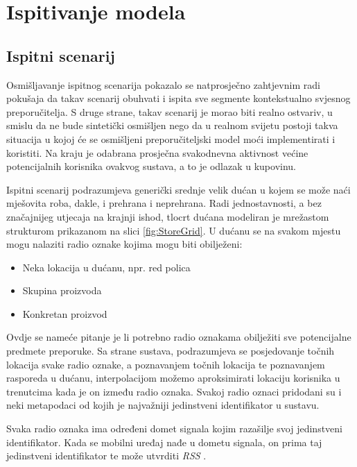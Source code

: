 \documentclass[times, utf8, diplomski, numeric]{fer}
\begin{document}
\chapter{Ispitivanje modela}
\section{Ispitni scenarij}
Osmišljavanje ispitnog scenarija pokazalo se natprosječno zahtjevnim radi
pokušaja da takav scenarij obuhvati i ispita sve segmente kontekstualno svjesnog
preporučitelja. S druge strane, takav scenarij je morao biti realno
ostvariv, u smislu da ne bude sintetički osmišljen nego da u realnom
svijetu postoji takva situacija u kojoj će se osmišljeni preporučiteljski
model moći implementirati i koristiti. Na kraju je odabrana prosječna
svakodnevna aktivnost većine potencijalnih korisnika ovakvog sustava, a to je
odlazak u kupovinu.

Ispitni scenarij podrazumjeva generički srednje velik dućan u kojem se
može naći mješovita roba, dakle, i prehrana i neprehrana. Radi jednostavnosti, a
bez značajnijeg utjecaja na krajnji ishod, tlocrt dućana modeliran je mrežastom
strukturom prikazanom na slici \ref{fig:StoreGrid}. U dućanu se na svakom mjestu
mogu nalaziti radio oznake  kojima mogu biti obilježeni:
\begin{itemize}
  \item Neka lokacija u dućanu, npr. red polica
  \item Skupina proizvoda
  \item Konkretan proizvod
\end{itemize}
Ovdje se nameće pitanje je li potrebno radio oznakama obilježiti sve
potencijalne predmete preporuke. Sa strane sustava, podrazumjeva se
posjedovanje točnih lokacija svake radio oznake, a poznavanjem točnih lokacija
te poznavanjem rasporeda u dućanu, interpolacijom možemo aproksimirati lokaciju
korisnika u trenutcima kada je on između radio oznaka. Svakoj radio oznaci
pridodani su i neki metapodaci od kojih je najvažniji jedinstveni identifikator
u sustavu.

Svaka radio oznaka ima određeni domet signala kojim razašilje 
svoj jedinstveni identifikator. Kada se mobilni uređaj nađe u dometu signala, on
prima taj jedinstveni identifikator te može utvrditi \emph{RSS} . 
\end{document}

